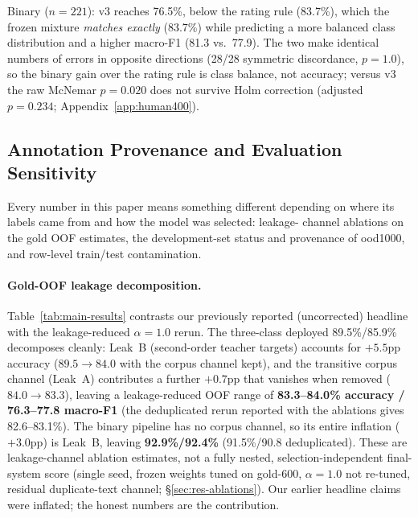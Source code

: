 Binary ($n{=}221$): v3 reaches 76.5\%, below the rating rule (83.7\%),
which the frozen mixture \emph{matches exactly} (83.7\%) while
predicting a more balanced class distribution and a higher macro-F1
(81.3 vs.\ 77.9). The two make identical numbers of errors in
opposite directions (28/28 symmetric discordance, $p{=}1.0$), so the
binary gain over the rating rule is class balance, not accuracy;
versus v3 the raw McNemar $p{=}0.020$ does not survive Holm correction
(adjusted $p{=}0.234$; Appendix~\ref{app:human400}).

\subsection{Annotation Provenance and Evaluation Sensitivity}
\label{sec:res-provenance}

Every number in this paper means something different depending on
where its labels came from and how the model was selected: leakage-
channel ablations on the gold OOF estimates, the development-set
status and provenance of ood1000, and row-level train/test
contamination.

\paragraph{Gold-OOF leakage decomposition.}
Table~\ref{tab:main-results} contrasts our previously reported
(uncorrected) headline with the leakage-reduced $\alpha{=}1.0$ rerun.
The three-class deployed 89.5\%/85.9\% decomposes cleanly: Leak~B
(second-order teacher targets) accounts for $+5.5$pp accuracy
($89.5\to84.0$ with the corpus channel kept), and the transitive
corpus channel (Leak~A) contributes a further $+0.7$pp that vanishes
when removed ($84.0\to83.3$), leaving a leakage-reduced OOF range of
\textbf{83.3--84.0\% accuracy / 76.3--77.8 macro-F1} (the deduplicated
rerun reported with the ablations gives 82.6--83.1\%). The binary
pipeline has no corpus channel, so its entire inflation ($+3.0$pp) is
Leak~B, leaving \textbf{92.9\%/92.4\%} (91.5\%/90.8 deduplicated).
These are leakage-channel ablation estimates, not a fully nested,
selection-independent final-system score (single seed, frozen weights
tuned on gold-600, $\alpha{=}1.0$ not re-tuned, residual
duplicate-text channel; \S\ref{sec:res-ablations}). Our earlier
headline claims were inflated; the honest numbers are the
contribution.

